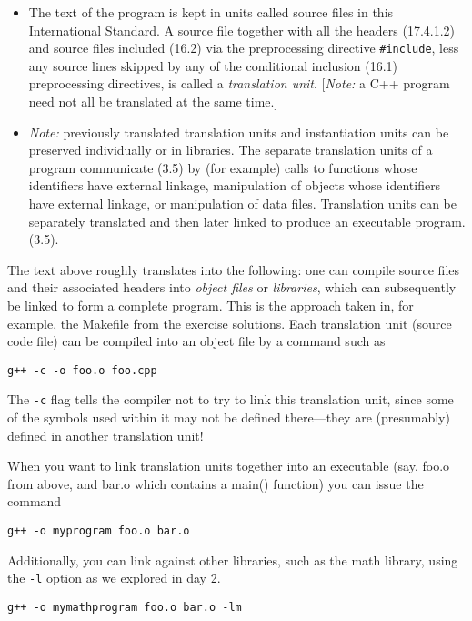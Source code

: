 \documentclass[a4paper]{scrartcl}
\begin{document}
\begin{itemize}
	\item The text of the program is kept in units called source files in this International Standard. A source file together with all the headers (17.4.1.2) and source files included (16.2) via the preprocessing directive \verb|#include|, less any source lines skipped by any of the conditional inclusion (16.1) preprocessing directives, is called a \emph{translation unit}. [\emph{Note:} a C++ program need not all be translated at the same time.]

	\item \emph{Note:} previously translated translation units and instantiation units can be preserved individually or in libraries. The separate translation units of a program communicate (3.5) by (for example) calls to functions whose identifiers have external linkage, manipulation of objects whose identifiers have external linkage, or manipulation of data files. Translation units can be separately translated and then later linked to produce an executable program. (3.5).
\end{itemize}

The text above roughly translates into the following: one can compile source files and their associated headers into \emph{object files} or \emph{libraries}, which can subsequently be linked to form a complete program. This is the approach taken in, for example, the Makefile from the exercise solutions. Each translation unit (source code file) can be compiled into an object file by a command such as

\begin{verbatim}
g++ -c -o foo.o foo.cpp
\end{verbatim}

The \verb|-c| flag tells the compiler not to try to link this translation unit, since some of the symbols used within it may not be defined there---they are (presumably) defined in another translation unit!

When you want to link translation units together into an executable (say, foo.o from above, and bar.o which contains a main() function) you can issue the command
\begin{verbatim}
g++ -o myprogram foo.o bar.o
\end{verbatim}

Additionally, you can link against other libraries, such as the math library, using the \verb|-l| option as we explored in day 2.

\begin{verbatim}
g++ -o mymathprogram foo.o bar.o -lm
\end{verbatim}
\end{document}
